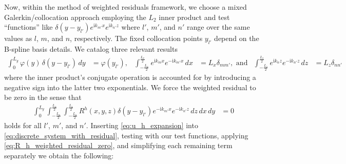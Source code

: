 \documentclass[letterpaper,11pt,nointlimits,reqno]{amsart}
\newcommand{\ii}{\ensuremath{\mathrm{i}}}
\begin{document}
Now, within the method of weighted residuals framework, we choose a mixed
Galerkin/collocation approach employing the $L_{2}$ inner product and test
``functions'' like $\delta(y-y_{l'}) e^{\ii k_{m'} x}e^{\ii k_{n'} z}$ where
$l'$, $m'$, and $n'$ range over the same values as $l$, $m$, and $n$,
respectively.  The fixed collocation points $y_{l'}$ depend on the B-spline
basis details.  We catalog three relevant results
\begin{align}
   \int_0^{L_y} \varphi(y) \, \delta(y-y_{l'}) \,d\!y
&= \varphi(y_{l'}),
&
   \int_{-\frac{L_x}{2}}^{\frac{L_x}{2}} e^{\ii k_m x} e^{-\ii k_{m'} x} \,d\!x
&= L_x \delta_{m m'}, \text{ and}
&
   \int_{-\frac{L_z}{2}}^{\frac{L_z}{2}} e^{\ii k_n z} e^{-\ii k_{n'} z} \,d\!z
&= L_z \delta_{n n'}
\end{align}
where the inner product's conjugate operation is accounted for by introducing a
negative sign into the latter two exponentials.  We force the weighted residual
to be zero in the sense that
\begin{align}
  \int_0^{L_y}
  \int_{-\frac{L_x}{2}}^{\frac{L_x}{2}}
  \int_{-\frac{L_z}{2}}^{\frac{L_z}{2}}
  R^h\!\left(x,y,z\right) \delta(y-y_{l'}) e^{-\ii k_{m'} x}e^{-\ii k_{n'} z}
  \,d\!z \,d\!x \,d\!y
  &=
  0
  \label{eq:R_h_weighted_residual_zero}
\end{align}
holds for all $l'$, $m'$, and $n'$.  Inserting \eqref{eq:u_h_expansion} into
\eqref{eq:discrete_system_with_residual}, testing with our test functions,
applying \eqref{eq:R_h_weighted_residual_zero}, and simplifying each remaining
term separately we obtain the following:
\end{document}
